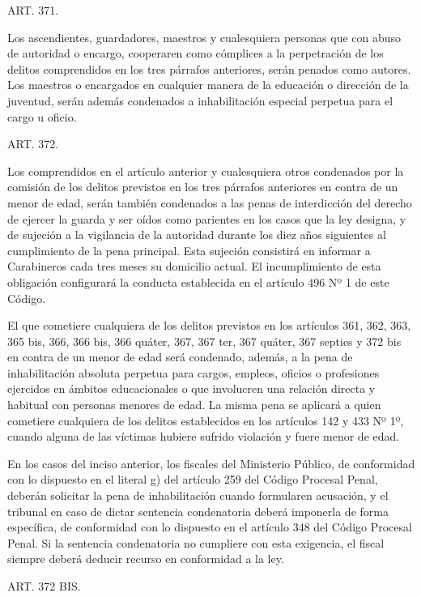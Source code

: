     ART. 371.

    Los ascendientes, guardadores, maestros y cualesquiera personas que con abuso de autoridad o encargo, cooperaren como cómplices a la perpetración de los delitos comprendidos en los tres párrafos anteriores, serán penados como autores.
    Los maestros o encargados en cualquier manera de la educación o dirección de la juventud, serán además condenados a inhabilitación especial perpetua para el cargo u oficio.



    ART. 372.

    Los comprendidos en el artículo anterior y cualesquiera otros condenados por la comisión de los delitos previstos en los tres párrafos anteriores en contra de un menor de edad, serán también condenados a las penas de interdicción del derecho de ejercer la guarda y ser oídos como parientes en los casos que la ley designa, y de sujeción a la vigilancia de la autoridad durante los diez años siguientes al cumplimiento de la pena principal. Esta sujeción consistirá en informar a Carabineros cada tres meses su domicilio actual. El incumplimiento de esta obligación configurará la conducta establecida en el artículo 496 Nº 1 de este Código.

    El que cometiere cualquiera de los delitos previstos en los artículos 361, 362, 363, 365 bis, 366, 366 bis, 366 quáter, 367, 367 ter, 367 quáter, 367 septies y 372 bis en contra de un menor de edad será condenado, además, a la pena de inhabilitación absoluta perpetua para cargos, empleos, oficios o profesiones ejercidos en ámbitos educacionales o que involucren una relación directa y habitual con personas menores de edad. La misma pena se aplicará a quien cometiere cualquiera de los delitos establecidos en los artículos 142 y 433 Nº 1º, cuando alguna de las víctimas hubiere sufrido violación y fuere menor de edad.

    En los casos del inciso anterior, los fiscales del Ministerio Público, de conformidad con lo dispuesto en el literal g) del artículo 259 del Código Procesal Penal, deberán solicitar la pena de inhabilitación cuando formularen acusación, y el tribunal en caso de dictar sentencia condenatoria deberá imponerla de forma específica, de conformidad con lo dispuesto en el artículo 348 del Código Procesal Penal. Si la sentencia condenatoria no cumpliere con esta exigencia, el fiscal siempre deberá deducir recurso en conformidad a la ley.



    ART. 372 BIS.

